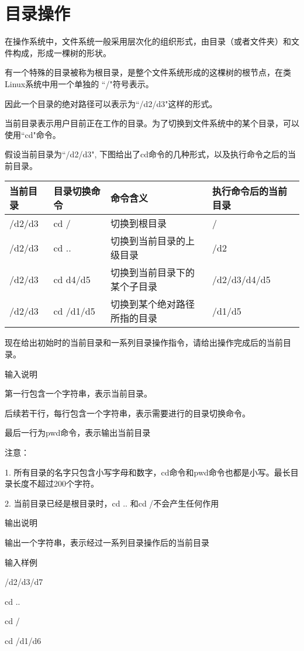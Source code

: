\section{目录操作}
在操作系统中，文件系统一般采用层次化的组织形式，由目录（或者文件夹）和文件构成，形成一棵树的形状。

有一个特殊的目录被称为根目录，是整个文件系统形成的这棵树的根节点，在类Linux系统中用一个单独的 ``/"符号表示。

因此一个目录的绝对路径可以表示为``/d2/d3"这样的形式。

当前目录表示用户目前正在工作的目录。为了切换到文件系统中的某个目录，可以使用``cd"命令。

假设当前目录为``/d2/d3", 下图给出了cd命令的几种形式，以及执行命令之后的当前目录。

\begin{tabular}{|l|l|l|l|}
	\hline 
	\textbf{当前目录} & \textbf{目录切换命令} & \textbf{命令含义} & \textbf{执行命令后的当前目录} \\ 
	\hline 
	/d2/d3 & cd / & 切换到根目录 & / \\ 
	\hline 
	/d2/d3 & cd .. & 切换到当前目录的上级目录 & /d2 \\ 
	\hline 
	/d2/d3 & cd d4/d5 & 切换到当前目录下的某个子目录 & /d2/d3/d4/d5 \\ 
	\hline 
	/d2/d3 & cd /d1/d5 & 切换到某个绝对路径所指的目录 & /d1/d5 \\ 
	\hline 
\end{tabular} 

现在给出初始时的当前目录和一系列目录操作指令，请给出操作完成后的当前目录。

输入说明	

第一行包含一个字符串，表示当前目录。

后续若干行，每行包含一个字符串，表示需要进行的目录切换命令。

最后一行为pwd命令，表示输出当前目录

注意：

1.	所有目录的名字只包含小写字母和数字，cd命令和pwd命令也都是小写。最长目录长度不超过200个字符。

2.	当前目录已经是根目录时，cd .. 和cd /不会产生任何作用

输出说明

输出一个字符串，表示经过一系列目录操作后的当前目录

输入样例	

/d2/d3/d7

cd ..

cd /

cd /d1/d6

